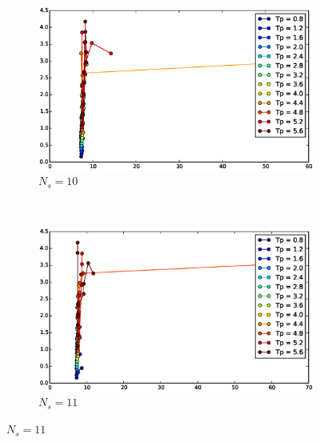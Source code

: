\begin{figure}[!h]
        \centering
        ~ %
        \begin{subfigure}[b]{0.48\textwidth}
                \includegraphics[width=\textwidth]{./img/realtime/Scenario_3__N_knots_6/tot10.eps}
                \caption{$N_s = 10$}\label{fig:ttot1}
        \end{subfigure}
        ~ %
        \begin{subfigure}[b]{0.48\textwidth}
                \includegraphics[width=\textwidth]{./img/realtime/Scenario_3__N_knots_6/tot11.eps}
                \caption{$N_s = 11$}\label{fig:ttot2}
        \end{subfigure}
        

\end{figure}
